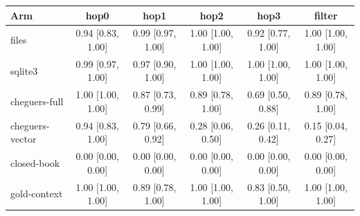 \begin{tabular}{lccccc}
\toprule
Arm & hop0 & hop1 & hop2 & hop3 & filter \\
\midrule
files & 0.94 {\scriptsize[0.83, 1.00]} & 0.99 {\scriptsize[0.97, 1.00]} & 1.00 {\scriptsize[1.00, 1.00]} & 0.92 {\scriptsize[0.77, 1.00]} & 1.00 {\scriptsize[1.00, 1.00]} \\
sqlite3 & 0.99 {\scriptsize[0.97, 1.00]} & 0.97 {\scriptsize[0.90, 1.00]} & 1.00 {\scriptsize[1.00, 1.00]} & 1.00 {\scriptsize[1.00, 1.00]} & 1.00 {\scriptsize[1.00, 1.00]} \\
cheguers-full & 1.00 {\scriptsize[1.00, 1.00]} & 0.87 {\scriptsize[0.73, 0.99]} & 0.89 {\scriptsize[0.78, 1.00]} & 0.69 {\scriptsize[0.50, 0.88]} & 0.89 {\scriptsize[0.78, 1.00]} \\
cheguers-vector & 0.94 {\scriptsize[0.83, 1.00]} & 0.79 {\scriptsize[0.66, 0.92]} & 0.28 {\scriptsize[0.06, 0.50]} & 0.26 {\scriptsize[0.11, 0.42]} & 0.15 {\scriptsize[0.04, 0.27]} \\
\midrule
closed-book & 0.00 {\scriptsize[0.00, 0.00]} & 0.00 {\scriptsize[0.00, 0.00]} & 0.00 {\scriptsize[0.00, 0.00]} & 0.00 {\scriptsize[0.00, 0.00]} & 0.00 {\scriptsize[0.00, 0.00]} \\
gold-context & 1.00 {\scriptsize[1.00, 1.00]} & 0.89 {\scriptsize[0.78, 1.00]} & 1.00 {\scriptsize[1.00, 1.00]} & 0.83 {\scriptsize[0.50, 1.00]} & 1.00 {\scriptsize[1.00, 1.00]} \\
\bottomrule
\end{tabular}
